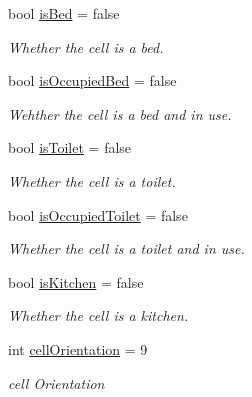 \begin{DoxyCompactItemize}
\mbox{\label{class_cell_a90887fb2f575d1938926eb2d538a333b}} 
bool \hyperlink{class_cell_a90887fb2f575d1938926eb2d538a333b}{is\+Bed} = false
\begin{DoxyCompactList}\small\item\em Whether the cell is a bed. \end{DoxyCompactList}\item 
\mbox{\label{class_cell_ac653b32cbc54e679883ad9699557f86c}} 
bool \hyperlink{class_cell_ac653b32cbc54e679883ad9699557f86c}{is\+Occupied\+Bed} = false
\begin{DoxyCompactList}\small\item\em Wehther the cell is a bed and in use. \end{DoxyCompactList}\item 
\mbox{\label{class_cell_a850b57eb873da4733a5253ecf432fb29}} 
bool \hyperlink{class_cell_a850b57eb873da4733a5253ecf432fb29}{is\+Toilet} = false
\begin{DoxyCompactList}\small\item\em Whether the cell is a toilet. \end{DoxyCompactList}\item 
\mbox{\label{class_cell_a31692ab53e4de80fd78153acb4553bb3}} 
bool \hyperlink{class_cell_a31692ab53e4de80fd78153acb4553bb3}{is\+Occupied\+Toilet} = false
\begin{DoxyCompactList}\small\item\em Whether the cell is a toilet and in use. \end{DoxyCompactList}\item 
\mbox{\label{class_cell_a2a7426d84b03f02c565199adf2ac7c30}} 
bool \hyperlink{class_cell_a2a7426d84b03f02c565199adf2ac7c30}{is\+Kitchen} = false
\begin{DoxyCompactList}\small\item\em Whether the cell is a kitchen. \end{DoxyCompactList}\item 
\mbox{\label{class_cell_a4a2b5e80374320e0a58defa625553969}} 
int \hyperlink{class_cell_a4a2b5e80374320e0a58defa625553969}{cell\+Orientation} = 9
\begin{DoxyCompactList}\small\item\em cell Orientation \end{DoxyCompactList}\end{DoxyCompactItemize}


